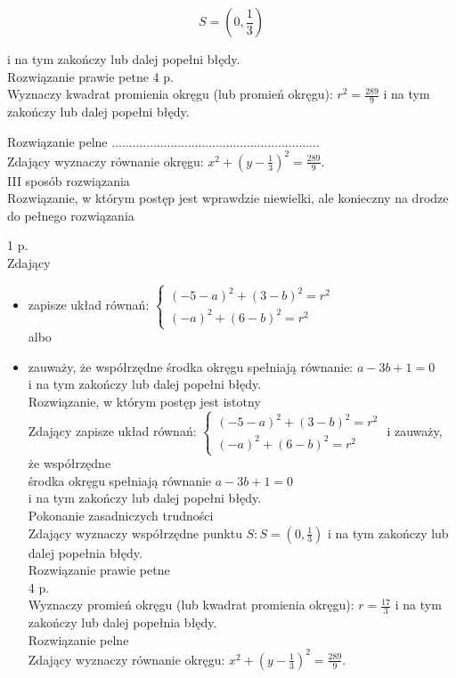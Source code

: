 \documentclass[10pt]{article}
\begin{document}
$$
S=\left(0, \frac{1}{3}\right)
$$

i na tym zakończy lub dalej popełni błędy.\\
Rozwiązanie prawie petne 4 p.\\
Wyznaczy kwadrat promienia okręgu (lub promień okręgu): $r^{2}=\frac{289}{9}$ i na tym zakończy lub dalej popełni błędy.

Rozwiązanie pelne ............................................................\\
Zdający wyznaczy równanie okręgu: $x^{2}+\left(y-\frac{1}{3}\right)^{2}=\frac{289}{9}$.\\
III sposób rozwiązania\\
Rozwiązanie, w którym postęp jest wprawdzie niewielki, ale konieczny na drodze do pełnego rozwiązania

1 p.\\
Zdający

\begin{itemize}
  \item zapisze układ równań: $\left\{\begin{array}{l}(-5-a)^{2}+(3-b)^{2}=r^{2} \\ (-a)^{2}+(6-b)^{2}=r^{2}\end{array}\right.$\\
albo
  \item zauważy, że współrzędne środka okręgu spełniają równanie: $a-3 b+1=0$\\
i na tym zakończy lub dalej popełni błędy.\\
Rozwiązanie, w którym postęp jest istotny\\
Zdający zapisze układ równań: $\left\{\begin{array}{l}(-5-a)^{2}+(3-b)^{2}=r^{2} \\ (-a)^{2}+(6-b)^{2}=r^{2}\end{array}\right.$ i zauważy, że współrzędne\\
środka okręgu spełniają równanie $a-3 b+1=0$\\
i na tym zakończy lub dalej popełni błędy.\\
Pokonanie zasadniczych trudności\\
Zdający wyznaczy współrzędne punktu $S: S=\left(0, \frac{1}{3}\right)$ i na tym zakończy lub dalej popełnia błędy.\\
Rozwiązanie prawie petne\\
4 p.\\
Wyznaczy promień okręgu (lub kwadrat promienia okręgu): $r=\frac{17}{3}$ i na tym zakończy lub dalej popełnia błędy.\\
Rozwiązanie pelne\\
Zdający wyznaczy równanie okręgu: $x^{2}+\left(y-\frac{1}{3}\right)^{2}=\frac{289}{9}$.
\end{itemize}
\end{document}
